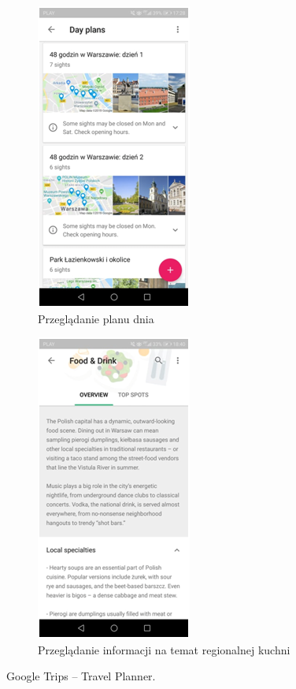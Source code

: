 \documentclass[10pt,twoside,a4paper]{report}
\begin{document}
\begin{figure}[h]
\begin{subfigure}{0.5\textwidth}
\centering
\includegraphics[width=0.9\linewidth, width=5cm]{googletrips3}
\caption{Przeglądanie planu dnia}
\label{fig:GTsubim3}
\end{subfigure}
\begin{subfigure}{0.5\textwidth}
\centering
\includegraphics[width=0.9\linewidth, width=5cm]{googletrips4}
\caption{Przeglądanie informacji na temat regionalnej kuchni}
\label{fig:GTsubim4}
\end{subfigure}
\caption{Google Trips -- Travel Planner.}
\label{fig:GTimage2}
\end{figure}
\end{document}
